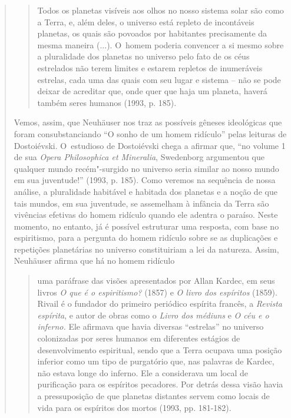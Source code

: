 {\begin{quote}
\begin{quote}
Todos os planetas visíveis aos olhos no nosso sistema solar são como a
Terra, e, além deles, o universo está repleto de incontáveis planetas,
os quais são povoados por habitantes precisamente da mesma maneira
(...). O~homem poderia convencer a si mesmo sobre a pluralidade dos
planetas no universo pelo fato de os céus estrelados não terem limites e
estarem repletos de inumeráveis estrelas, cada uma das quais com seu
lugar e sistema -- não se pode deixar de acreditar que, onde quer que
haja um planeta, haverá também seres humanos (1993, p. 185).
\end{quote}

Vemos, assim, que Neuhäuser nos traz as possíveis gêneses ideológicas
que foram consubstanciando ``O sonho de um homem ridículo'' pelas
leituras de Dostoiévski. O~estudioso de Dostoiévski chega a afirmar que,
``no volume 1 de sua \emph{Opera Philosophica et Mineralia}, Swedenborg
argumentou que qualquer mundo recém"-surgido no universo seria similar ao
nosso mundo em sua juventude!'' (1993, p. 185). Como veremos na
sequência de nossa análise, a pluralidade habitável e habitada dos
planetas e a noção de que tais mundos, em sua juventude, se assemelham à
infância da Terra são vivências efetivas do homem ridículo quando ele
adentra o paraíso. Neste momento, no entanto, já é possível estruturar
uma resposta, com base no espiritismo, para a pergunta do homem ridículo
sobre se as duplicações e repetições planetárias no universo
constituiriam a lei da natureza. Assim, Neuhäuser afirma que há no homem
ridículo

\begin{quote}
uma paráfrase das visões apresentados por Allan Kardec, em seus livros
\emph{O que é o espiritismo?} (1857) e \emph{O livro dos espíritos}
(1859). Rivail é o fundador do primeiro periódico espírita francês, a
\emph{Revista espírita}, e autor de obras como o \emph{Livro dos
médiuns} e \emph{O céu e o inferno.} Ele afirmava que havia diversas
``estrelas'' no universo colonizadas por seres humanos em diferentes
estágios de desenvolvimento espiritual, sendo que a Terra ocupava uma
posição inferior como um tipo de purgatório que, nas palavras de Kardec,
não estava longe do inferno. Ele a considerava um local de purificação
para os espíritos pecadores. Por detrás dessa visão havia a
pressuposição de que planetas distantes servem como locais de vida para
os espíritos dos mortos (1993, pp. 181-182).
\end{quote}


\end{quote}}
